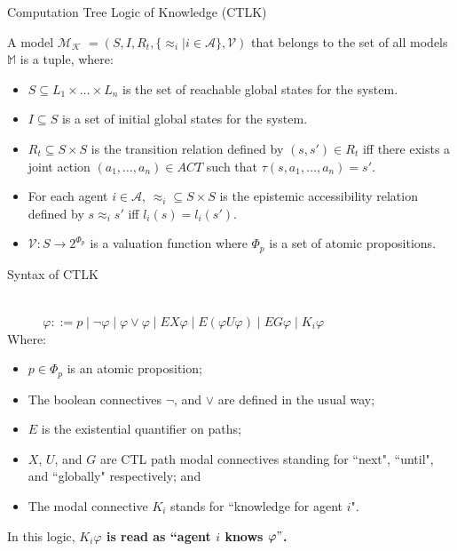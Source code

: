 \documentclass{beamer}
\begin{document}
\begin{frame}{Computation Tree Logic of Knowledge (CTLK)}
\begin{definition} \label{Model of CTLK}
A model $ \mathcal{M_K}$ $=(S,I,R_t,\{\approx_i|i\in \mathcal{ A}\}, \mathcal{V})$ that belongs to the set of all models $\mathbb{M}$ is a tuple, where:
\begin {itemize}
\item $ S \subseteq L_1 \times \dots \times L_n $ is the set of
reachable global states for the system.
\item $ I \subseteq S $ is a set of initial global states for the system.
\item $ R_t \subseteq S \times S $ is the transition relation defined by $( s,s') \in R_t $ iff there exists a joint action $( a_1, \dots , a_n) \in ACT $ such that $ \tau (s, a_1, \dots, a_n) = s'$.
\item For each agent $i \in \mathcal{A}$, $ \approx _i  \subseteq S \times S
$ is the epistemic accessibility relation defined by $ s \approx_i
s' $ iff $ l_i(s) = l_i(s') $.
\item $ \mathcal{V} : S \rightarrow 2 ^{\Phi_p} $ is a valuation function where $\Phi_p $ is a set of atomic propositions.
\end {itemize}
\label {dfn: Model of CTLK}
\end{definition}
\end{frame}
\begin{frame}{Syntax of CTLK}
\begin{definition} \label{Syntax of CTLK}~\\
$~~~~~~~~~~~~~ \varphi ::= p \mid \neg \varphi \mid \varphi \vee
\varphi \mid EX \varphi  \mid E ( \varphi U \varphi) \mid EG
\varphi \mid K_i \varphi$\\
Where:
\begin{itemize}
\item $ p \in \Phi_p$ is an atomic proposition; \item The boolean
connectives $\neg$, and $\vee$ are defined in the usual way; \item
$E$ is the existential quantifier on paths; \item $X$, $U$, and
$G$ are CTL path modal connectives standing for ``next", ``until",
and ``globally" respectively; and \item The modal connective $K_i$
stands for ``knowledge for agent $i$".
\end{itemize}
\label {dfn: Syntax of CTLK}
\end{definition}
In this logic, \textbf{$K_i \varphi$ is read as ``agent $i$ knows
$\varphi"$.}
\end{frame}
\end{document}
